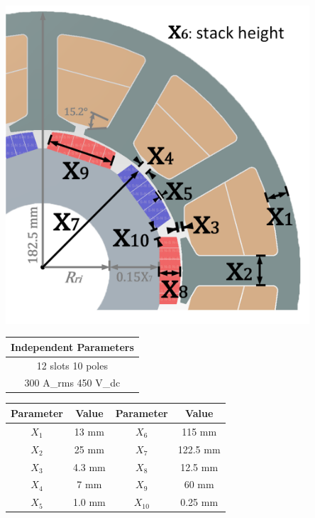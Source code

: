 \begin{minipage}{\textwidth}
  \begin{minipage}[b]{0.4\textwidth}
    \centering
    \includegraphics[width=0.85\textwidth]{Figures/Chp_RNN/Fig_1b.png}
    \label{fig:RNN_Fig_1}
  \end{minipage}
  \hfill
  \begin{minipage}[b]{0.59\textwidth}
    \centering
    \begin{tabular}{||c||}\hline
      Independent Parameters \\ \hline \hline
        12 slots \hspace{20pt} 10 poles \\
        300 A_{rms} \hspace{10pt} 450 V_{dc} \\ \hline \hline
    \end{tabular}
    \centering
    \begin{tabular}{||c|c||c|c||}\hline
      Parameter & Value & Parameter & Value \\ \hline \hline
        $X_1$ & 13 mm & $X_6$ & 115 mm\\
        $X_2$ & 25 mm & $X_7$ & 122.5 mm\\
        $X_3$ & 4.3 mm & $X_8$ & 12.5 mm\\
        $X_4$ & 7 mm & $X_9$ & 60 mm\\
        $X_5$ & 1.0 mm & $X_{10}$ & 0.25 mm\\ \hline
      \end{tabular}
    \end{minipage}
  \end{minipage}
  
